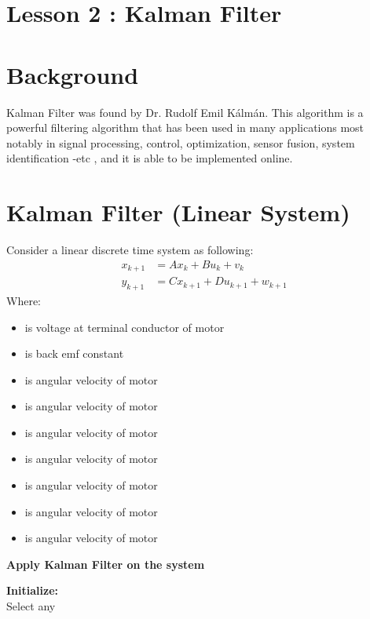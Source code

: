 \documentclass[12pt,a4paper]{article}
\begin{document}
	\section*{\centering Lesson 2 : Kalman Filter}
	\section{Background}
	Kalman Filter was found by Dr. Rudolf Emil Kálmán. This algorithm is a powerful filtering algorithm that has been used in many applications most notably in signal processing, control, optimization, sensor fusion, system identification -etc , and it is able to be implemented online.
	\section{Kalman Filter (Linear System)}
	Consider a linear discrete time system as following:
	\begin{equation}
		\begin{split}
			x_{k+1} &= Ax_k + Bu_k + v_k \\
			y_{k+1} &= Cx_{k+1} + Du_{k+1} + w_{k+1}
		\end{split}
		\label{eq1}
	\end{equation}
	Where:
	\begin{itemize}
		\item { is voltage at terminal conductor of motor }
		\item { is back emf constant}
		\item { is angular velocity of motor}
		\item { is angular velocity of motor}
		\item { is angular velocity of motor}
		\item { is angular velocity of motor}
		\item { is angular velocity of motor}
		\item { is angular velocity of motor}
		\item { is angular velocity of motor}
	\end{itemize}
	\begin{center}
		\textbf{Apply Kalman Filter on the system}
	\end{center}
	\textbf{Initialize:}\\
	Select any
\end{document}
